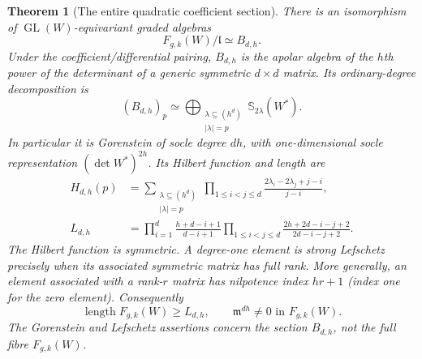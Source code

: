 \documentclass[11pt,reqno]{amsart}
\numberwithin{equation}{section}
\newtheorem{theorem}{Theorem}[section]
\theoremstyle{definition}\newtheorem{definition}[theorem]{Definition}
\theoremstyle{remark}\newtheorem{remark}[theorem]{Remark}
\DeclareMathOperator{\length}{length}
\begin{document}
\begin{theorem}[The entire quadratic coefficient section]
\label{thm:quadratic-section-v155}
There is an isomorphism of $\operatorname{GL}(W)$-equivariant graded
algebras
\begin{equation}\label{eq:exact-section-v155}
                 F_{g,k}(W)/\mathfrak l\simeq B_{d,h}.
\end{equation}
Under the coefficient/differential pairing, $B_{d,h}$ is the apolar
algebra of the $h$th power of the determinant of a generic symmetric
$d\times d$ matrix.  Its ordinary-degree decomposition is
\begin{equation}\label{eq:section-character-v155}
 (B_{d,h})_p\simeq
 \bigoplus_{\substack{\lambda\subseteq(h^d)\\|\lambda|=p}}
                         \mathbb S_{2\lambda}(W^*).
\end{equation}
In particular it is Gorenstein of socle degree $dh$, with
one-dimensional socle representation $(\det W^*)^{2h}$.  Its Hilbert
function and length are
\begin{align}
 H_{d,h}(p)&=\sum_{\substack{\lambda\subseteq(h^d)\\|\lambda|=p}}
       \prod_{1\leq i<j\leq d}
             \frac{2\lambda_i-2\lambda_j+j-i}{j-i},
                     \label{eq:section-hilbert-v155}\\
 L_{d,h}&=\prod_{i=1}^d\frac{h+d-i+1}{d-i+1}
       \prod_{1\leq i<j\leq d}
             \frac{2h+2d-i-j+2}{2d-i-j+2}.
                     \label{eq:section-length-v155}
\end{align}
The Hilbert function is symmetric.  A degree-one element is strong
Lefschetz precisely when its associated symmetric matrix has full
rank.  More generally, an element associated with a rank-$r$ matrix
has nilpotence index $hr+1$ (index one for the zero element).
Consequently
\begin{equation}\label{eq:full-fibre-bounds-v155}
 \length F_{g,k}(W)\geq L_{d,h},\qquad
 \mathfrak m^{dh}\ne0\text{ in }F_{g,k}(W).
\end{equation}
The Gorenstein and Lefschetz assertions concern the section
$B_{d,h}$, not the full fibre $F_{g,k}(W)$.
\end{theorem}
\end{document}
